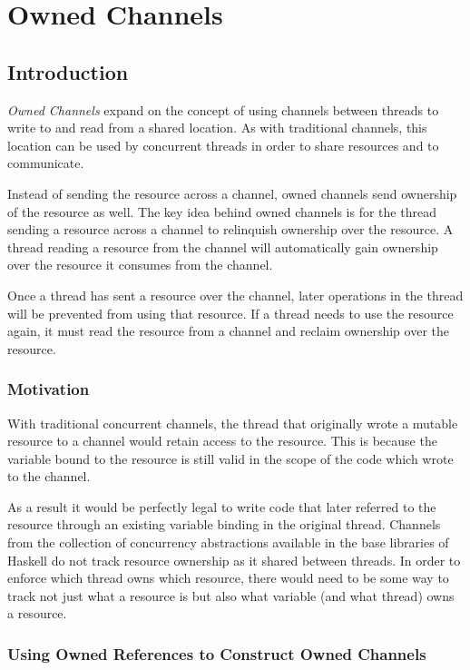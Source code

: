 \documentclass[onehalf,11pt]{beavtex}
\begin{document}
\chapter{Owned Channels}

\section{Introduction}

\textit{Owned Channels} expand on the concept of using channels between threads
to write to and read from a shared location.   As with traditional channels,
this location can be used by concurrent threads in order to share resources and
to communicate.

Instead of sending the resource across a channel, owned channels
send ownership of the resource as well.
The key idea behind owned channels is for the thread sending a
resource across a channel to relinquish ownership over the resource.
A thread reading a resource from the channel will automatically gain ownership
over the resource it consumes from the channel.

Once a thread has sent a resource over the channel,
later operations in the thread will be prevented from using that resource.
If a thread needs to use the resource again, it must read the
resource from a channel and reclaim ownership over the resource.

\subsection{Motivation}

With traditional concurrent channels, the thread that originally wrote
a mutable resource to a channel would retain access to the resource. This is
because the variable bound to the resource is still valid in the scope of the
code which wrote to the channel.

As a result it would be perfectly legal to write code that later referred to the
resource through an existing variable binding in the original thread.
Channels from the collection of concurrency abstractions available in the
base libraries of Haskell do not track resource ownership as it shared
between threads.
In order to enforce which thread owns which resource, there would need to be
some way to track not just what a resource is but also what variable (and what
thread) owns a resource.

\subsection{Using Owned References to Construct Owned Channels}
\end{document}
